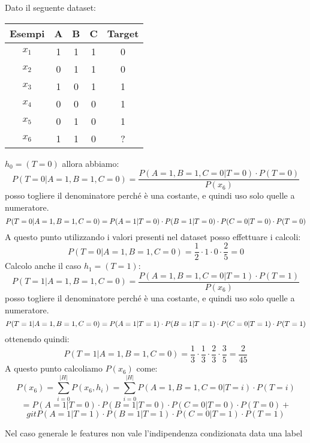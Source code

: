 \begin{esempio}
    Dato il seguente dataset:
    \begin{table}[!ht]
        \centering
        \begin{tabular}{c|ccc|c}
            Esempi & A & B & C & Target \\ \hline
            $x_1$  & 1 & 1 & 1 & 0      \\ \hline
            $x_2$  & 0 & 1 & 1 & 0      \\ \hline
            $x_3$  & 1 & 0 & 1 & 1      \\ \hline
            $x_4$  & 0 & 0 & 0 & 1      \\ \hline
            $x_5$  & 0 & 1 & 0 & 1      \\ \hline
            $x_6$  & 1 & 1 & 0 & ?      \\
        \end{tabular}
    \end{table}
    $h_0 = (T = 0)$ allora abbiamo:
    $$P(T = 0 | A = 1, B = 1, C = 0) = \frac{P(A = 1, B = 1, C = 0 | T = 0) \cdot P(T = 0)}{P(x_6)}$$
    posso togliere il denominatore perché è una costante, e quindi uso solo quelle a numeratore.
    $$P(T = 0 | A = 1, B = 1, C = 0) = \\ P(A = 1 | T = 0) \cdot P(B = 1 | T = 0) \cdot P(C = 0 | T = 0) \cdot P(T = 0)$$
    A questo punto utilizzando i valori presenti nel dataset posso effettuare i calcoli:
    $$P(T = 0 | A = 1, B = 1, C = 0) = \frac{1}{2} \cdot 1 \cdot 0 \cdot \frac{2}{5} = 0$$
    Calcolo anche il caso $h_1 = (T = 1)$: $$P(T = 1 | A = 1, B = 1, C = 0) = \frac{P(A = 1, B = 1, C = 0 | T = 1) \cdot P(T = 1)}{P(x_6)}$$
    posso togliere il denominatore perché è una costante, e quindi uso solo
    quelle a numeratore. $$P(T = 1 | A = 1, B = 1, C = 0) = \\ P(A = 1 | T = 1) \cdot P(B = 1 | T = 1) \cdot P(C = 0 | T = 1) \cdot P(T = 1)$$
    ottenendo quindi: $$P(T = 1 | A = 1, B = 1, C = 0) = \frac{1}{3} \cdot \frac{1}{3} \cdot \frac{2}{3} \cdot \frac{3}{5} = \frac{2}{45}$$
    A questo punto calcoliamo $P(x_6)$ come: $$P(x_6) = \sum_{i = 0}^{|H|} P(x_6, h_i) = \sum_{i = 0}^{|H|} P(A =  1, B = 1, C = 0 | T = i) \cdot P(T = i)$$
    $$= P(A = 1 | T = 0) \cdot P(B = 1 | T = 0) \cdot P(C = 0 | T = 0) \cdot P(T = 0) + $$ $$gitP(A = 1 | T = 1) \cdot P(B = 1 | T = 1) \cdot P(C = 0 | T = 1) \cdot P(T = 1)$$
\end{esempio}
Nel caso generale le features non vale l'indipendenza condizionata data una label

